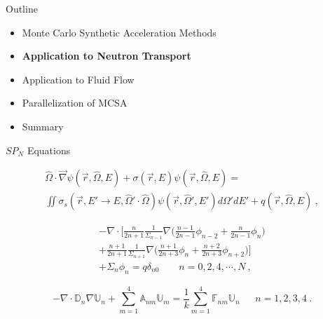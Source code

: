 \documentclass{beamer}
\begin{document}
\begin{frame}{Outline}

  \begin{itemize}
  \item Monte Carlo Synthetic Acceleration Methods
    \bigskip
  \item \textbf{Application to Neutron Transport}
    \bigskip
  \item Application to Fluid Flow
    \bigskip
  \item Parallelization of MCSA
    \bigskip
  \item Summary
  \end{itemize}

\end{frame}

\begin{frame}{$SP_N$ Equations}

  \begin{multline}
    \hat{\Omega} \cdot \vec{\nabla} \psi(\vec{r},\hat{\Omega},E) +
    \sigma(\vec{r},E) \psi(\vec{r},\hat{\Omega},E) = \\ \iint
    \sigma_s(\vec{r},E' \rightarrow E,\hat{\Omega}' \cdot \hat{\Omega})
    \psi(\vec{r},\hat{\Omega}',E') d\Omega' dE' +
    q(\vec{r},\hat{\Omega},E)\:,
    \label{eq:general_transport}
  \end{multline}

  \begin{multline}
    -\nabla \cdot \Bigg[\frac{n}{2n+1}\frac{1}{\Sigma_{n-1}} \nabla
      \Big(\frac{n-1}{2n-1} \phi_{n-2} + \frac{n}{2n-1}\phi_n \Big) \\+
      \frac{n+1}{2n+1}\frac{1}{\Sigma_{n+1}} \nabla
      \Big(\frac{n+1}{2n+3}\phi_n + \frac{n+2}{2n+3}\phi_{n+2}\Big)
      \Bigg] \\+ \Sigma_n \phi_n = q \delta_{n0}\ \ \ \ \ \ \ \ \ n =
    0,2,4,\cdots,N\:,
    \label{eq:spn_equations}
  \end{multline}

  \begin{equation}
    -\nabla \cdot \mathbb{D}_n \nabla \mathbb{U}_n + \sum_{m=1}^4
    \mathbb{A}_{nm} \mathbb{U}_m = \frac{1}{k} \sum_{m=1}^4
    \mathbb{F}_{nm} \mathbb{U}_n\ \ \ \ \ \ \ n = 1,2,3,4\:.
    \label{eq:spn_fission_matrix}
  \end{equation}

\end{frame}
\end{document}
